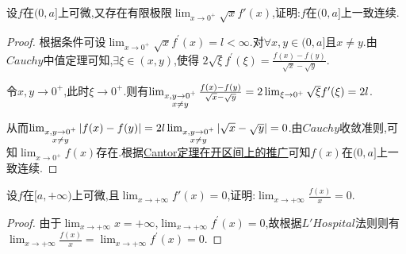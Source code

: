\documentclass[lang=cn,newtx,10pt,scheme=chinese]{elegantbook}
\begin{document}
\begin{exercise}
    设\(f\)在\((0,a]\)上可微,又存在有限极限\(\lim_{x \to 0^+} \sqrt{x}f'(x)\),证明:\(f\)在\((0,a]\)上一致连续.
\end{exercise}
\begin{proof}
    根据条件可设\(\lim_{x\rightarrow 0^+} \sqrt{x}f^{\prime}(x)=l<\infty\).对\(\forall x,y\in (0,a]\)且\(x\neq y\).由\(Cauchy\)中值定理可知,\(\exists \xi \in (x,y)\),使得
\(2\sqrt{\xi}f^{\prime}(\xi)=\frac{f(x) - f(y)}{\sqrt{x}-\sqrt{y}}\).

令\(x,y\rightarrow 0^+ \),此时\(\xi \rightarrow 0^+\).则有\(\lim_{\begin{subarray}{c}
x,y\rightarrow 0^+\\
x\neq y
\end{subarray}} \frac{f(x) - f(y)}{\sqrt{x}-\sqrt{y}}=2\lim_{\xi \rightarrow 0^+} \sqrt{\xi}f^{\prime}(\xi)=2l\).

从而\(\lim_{\begin{subarray}{c}
x,y\rightarrow 0^+\\
x\neq y
\end{subarray}} \vert f(x) - f(y)\vert = 2l\lim_{\begin{subarray}{c}
x,y\rightarrow 0^+\\
x\neq y
\end{subarray}} \vert\sqrt{x}-\sqrt{y}\vert = 0\).由\(Cauchy\)收敛准则,可知\(\lim_{x\rightarrow 0^+} f(x)\)存在.根据\hyperref[pro:Cantor定理在开区间上的推广]{Cantor定理在开区间上的推广}可知\(f(x)\)在\((0,a]\)上一致连续.
\end{proof}

\begin{exercise}
    设\(f\)在\([a,+\infty)\)上可微,且\(\lim_{x \to +\infty} f'(x) = 0\),证明:\(\lim_{x \to +\infty} \frac{f(x)}{x} = 0\).
\end{exercise}
\begin{proof}
    由于\(\lim_{x\rightarrow +\infty}x = +\infty\),\(\lim_{x\rightarrow +\infty}f^{\prime}(x) = 0\),故根据\(L'Hospital\)法则则有\(\lim_{x\rightarrow +\infty}\frac{f(x)}{x}=\lim_{x\rightarrow +\infty}f^{\prime}(x) = 0\).
\end{proof}
\end{document}
